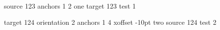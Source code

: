 \startTEXpage[offset=2cm]

     
        source  123
        anchors 1 2
        {one}
     
        target 123
        {test 1}

    \dontleavehmode {} 

     
        target      124
        orientation 2
        anchors     1 4
        xoffset    -10pt
        {two}
     
        source 124
        {test 2}

    \dontleavehmode {} 

\stopTEXpage
